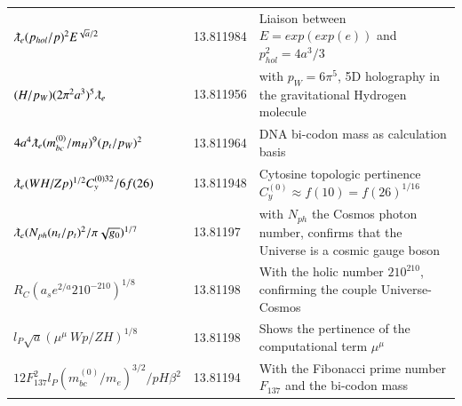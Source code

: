 \documentclass[a4paper,9pt]{article}
\begin{document}
\begin{table}
\begin{tabular}{lll}
  
 
  $ \lambdabar_e (p_{hol}/p)^2 E^{\sqrt a/2}$ & 13.811984 & Liaison between $E = exp(exp(e))$ and $p_{hol}^2 = 4a^3/3$   \\
  
 $(H/p_W)(2\pi^2 a^3)^5 \lambdabar_{e} $ & 13.811956 & with $p_W = 6\pi^5$, 5D holography in the gravitational Hydrogen molecule \cite{Sanchez3}  \\
 
 
 
   
  
  
  $ 4 a^4 \lambdabar_{e} (m_{bc}^{(0)}/m_H)^9 (p_t/p_W)^2  $ & 13.811964 & DNA bi-codon mass as calculation basis  \\
  
  
  $ \lambdabar_{e} (WH/Zp)^{1/2} C_y^{(0)32}/6f(26)   $ & 13.811948 & Cytosine topologic pertinence  $C_y^{(0)} \approx f(10)= f(26)^{1/16} $  \\
  
  $ \lambdabar_{e} (N_{ph}  (n_t/p_t)^2/\pi \sqrt{g_0})^{1/7} $ & 13.81197 & with $N_{ph}$ the Cosmos photon number, confirms that the Universe is a cosmic gauge boson \\
  
   
 $R_C (a_se^{2/a}210^{-210})^{1/8}$  & 13.81198    & With the holic number $210^{210}$, confirming the couple Universe- Cosmos \\
 
 
 $ l_{P} \sqrt a (\mu^{\mu}~Wp/ZH)^{1/8}$  & 13.81198 & Shows the pertinence of the computational term $\mu^{\mu}$   \\
 
 
  $12 F_{137}^2 l_P(m_{bc}^{(0)}/m_e)^{3/2}/pH\beta^2$ & 13.81194    & With the Fibonacci prime number $F_{137}$ and the bi-codon mass\\
  

\end{tabular}
\end{table}
\end{document}
